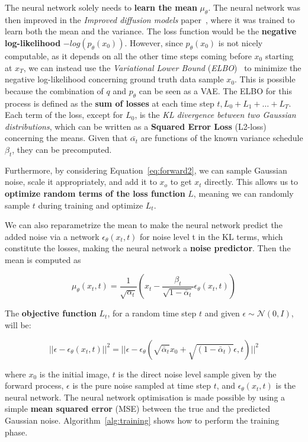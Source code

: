 \documentclass[sn-mathphys,Numbered]{sn-jnl}
\theoremstyle{thmstyleone}%
\theoremstyle{thmstyletwo}%
\theoremstyle{thmstylethree}%
\begin{document}
The neural network solely needs to \textbf{learn the mean} $\mu_\theta$.
The neural network was then improved in the \emph{Improved diffusion models} paper~\cite{nichol2021improved}, where it was trained to learn both the mean and the variance.
The loss function would be the \textbf{negative log-likelihood} $-log(p_\theta(x_0))$. 
However, since $p_\theta(x_0)$ is not nicely computable, as it depends on all the other time steps coming before  $x_0$ starting at $x_T$, we can instead use the \emph{Variational Lower Bound} (\emph{ELBO})~\cite{elbo} 
to minimize the negative log-likelihood concerning ground truth data sample $x_0$.
This is possible because the combination of $q$ and $p_\theta$ can be seen as a VAE.
The ELBO for this process is defined as the \textbf{sum of losses} at each time step $t, L_0 + L_1 + \dots + L_T$.
Each term of the loss, except for $L_0$, is the \emph{KL divergence between two Gaussian distributions},
which can be written as a \textbf{Squared Error Loss} (L2-loss) concerning the means.
Given that $\bar{\alpha_t}$ are functions of the known variance schedule $\beta_t$, they can be precomputed.

Furthermore, by considering Equation~\ref{eq:forward2}, we can sample Gaussian noise, 
scale it appropriately, and add it to $x_o$ to  get $x_t$ directly. This allows us
to \textbf{optimize random terms of the loss function} $L$, meaning we can randomly sample $t$ during training and optimize $L_t$.

We can also reparametrize the mean to make the neural network predict
the added noise via a network $\epsilon_\theta(x_t,t)$ for noise level t in the KL terms, which
constitute the losses, making the neural network a \textbf{noise predictor}.
Then the mean is computed as \cite{weng2021diffusion}

\begin{equation}
	\mu_\theta(x_t,t) =\frac{1}{\sqrt{\alpha_t}}\left(x_t - \frac{\beta_t}{\sqrt{1-\bar{\alpha}_t}}\epsilon_\theta(x_t,t)\right)
\end{equation}

The \textbf{objective function} $L_t$, for a random time step $t$ and given $\epsilon \sim \mathcal{N}(0,I)$, will be:

\begin{equation}
	||\epsilon-\epsilon_\theta(x_t,t)||^2 = ||\epsilon - \epsilon_\theta
	(\sqrt{\bar{\alpha}_t}x_0 + \sqrt{(1-\bar{\alpha}_t)}\epsilon,t) ||^2
\end{equation}

where $x_0$ is the initial image, $t$ is the direct noise level sample given by the
forward process, $\epsilon$ is the pure noise sampled at time step $t$, and 
$\epsilon_\theta(x_t,t)$ is the neural network. The neural network optimisation is made possible 
by using a simple \textbf{mean squared error} (MSE) between the true and the predicted Gaussian noise. Algorithm~\ref{alg:training} shows how to perform the training phase.
\end{document}
